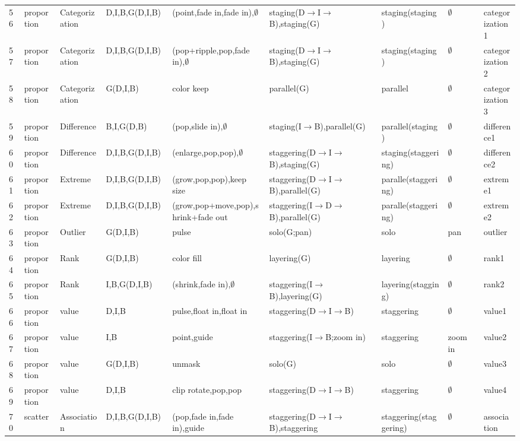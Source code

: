 \begin{landscape}
\begin{longtable}{p{0.035\linewidth}p{0.075\linewidth}p{0.09\linewidth}p{0.13\linewidth}p{0.19\linewidth}p{0.22\linewidth}p{0.13\linewidth}p{0.075\linewidth}p{0.08\linewidth}}
56 & proportion & Categorization & D,I,B,G(D,I,B) & (point,fade in,fade in),$\emptyset$ & staging(D$\rightarrow$I$\rightarrow$B),staging(G) & staging(staging) & $\emptyset$ & categorization1 \\
57 & proportion & Categorization & D,I,B,G(D,I,B) & (pop+ripple,pop,fade in),$\emptyset$ & staging(D$\rightarrow$I$\rightarrow$B),staging(G) & staging(staging) & $\emptyset$ & categorization2 \\
58 & proportion & Categorization & G(D,I,B) & color keep & parallel(G) & parallel & $\emptyset$ & categorization3 \\
59 & proportion & Difference & B,I,G(D,B) & (pop,slide in),$\emptyset$ & staging(I$\rightarrow$B),parallel(G) & parallel(staging) & $\emptyset$ & difference1 \\
60 & proportion & Difference & D,I,B,G(D,I,B) & (enlarge,pop,pop),$\emptyset$ & staggering(D$\rightarrow$I$\rightarrow$B),staging(G) & staging(staggering) & $\emptyset$ & difference2 \\
61 & proportion & Extreme & D,I,B,G(D,I,B) & (grow,pop,pop),keep size & staggering(D$\rightarrow$I$\rightarrow$B),parallel(G) & paralle(staggering) & $\emptyset$ & extreme1 \\
62 & proportion & Extreme & D,I,B,G(D,I,B) & (grow,pop+move,pop),shrink+fade out & staggering(I$\rightarrow$D$\rightarrow$B),parallel(G) & paralle(staggering) & $\emptyset$ & extreme2 \\
63 & proportion & Outlier & G(D,I,B) & pulse & solo(G;pan) & solo & pan & outlier \\
64 & proportion & Rank & G(D,I,B) & color fill & layering(G) & layering & $\emptyset$ & rank1 \\
65 & proportion & Rank & I,B,G(D,I,B) & (shrink,fade in),$\emptyset$ & staggering(I$\rightarrow$B),layering(G) & layering(stagging) & $\emptyset$ & rank2 \\
66 & proportion & value & D,I,B & pulse,float in,float in & staggering(D$\rightarrow$I$\rightarrow$B) & staggering & $\emptyset$ & value1 \\
67 & proportion & value & I,B & point,guide & staggering(I$\rightarrow$B;zoom in) & staggering & zoom in & value2 \\
68 & proportion & value & G(D,I,B) & unmask & solo(G) & solo & $\emptyset$ & value3 \\
69 & proportion & value & D,I,B & clip rotate,pop,pop & staggering(D$\rightarrow$I$\rightarrow$B) & staggering & $\emptyset$ & value4 \\
70 & scatter & Association & D,I,B,G(D,I,B) & (pop,fade in,fade in),guide & staggering(D$\rightarrow$I$\rightarrow$B),staggering & staggering(staggering) & $\emptyset$ & association \\

\end{longtable}
\end{landscape}
